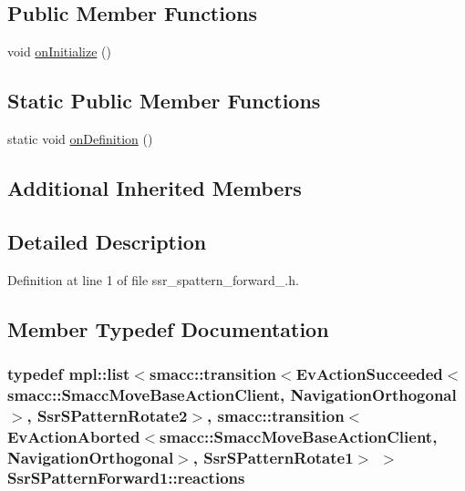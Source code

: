 \subsection*{Public Member Functions}
\begin{DoxyCompactItemize}
\item 
void \hyperlink{structSsrSPatternForward1_a4dcbd54092d60be69442ff7009a9b774}{on\+Initialize} ()
\end{DoxyCompactItemize}
\subsection*{Static Public Member Functions}
\begin{DoxyCompactItemize}
\item 
static void \hyperlink{structSsrSPatternForward1_a2e6358624ff796d27f68636609e2ce3d}{on\+Definition} ()
\end{DoxyCompactItemize}
\subsection*{Additional Inherited Members}


\subsection{Detailed Description}


Definition at line 1 of file ssr\+\_\+spattern\+\_\+forward\+\_.\+h.



\subsection{Member Typedef Documentation}
\subsubsection[{\texorpdfstring{reactions}{reactions}}]{\setlength{\rightskip}{0pt plus 5cm}typedef mpl\+::list$<${\bf smacc\+::transition}$<$Ev\+Action\+Succeeded$<${\bf smacc\+::\+Smacc\+Move\+Base\+Action\+Client}, {\bf Navigation\+Orthogonal}$>$, {\bf Ssr\+S\+Pattern\+Rotate2}$>$, {\bf smacc\+::transition}$<$Ev\+Action\+Aborted$<${\bf smacc\+::\+Smacc\+Move\+Base\+Action\+Client}, {\bf Navigation\+Orthogonal}$>$, {\bf Ssr\+S\+Pattern\+Rotate1}$>$ $>$ {\bf Ssr\+S\+Pattern\+Forward1\+::reactions}}\hypertarget{structSsrSPatternForward1_ac75b9df8ec5d172b84ecdccf7bd4d094}{}\label{structSsrSPatternForward1_ac75b9df8ec5d172b84ecdccf7bd4d094}



